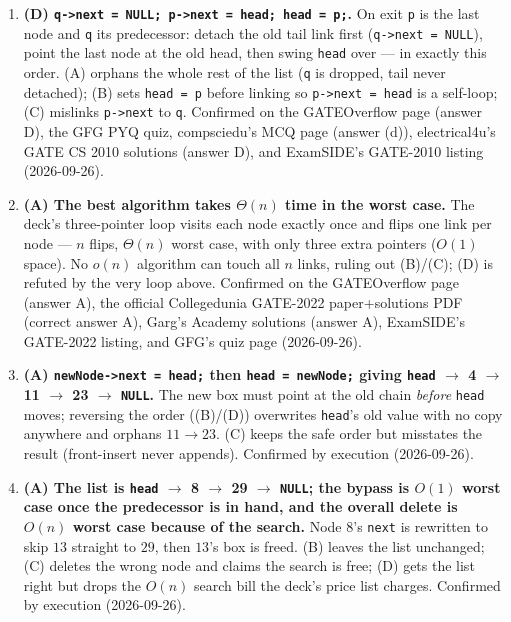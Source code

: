 \documentclass[11pt]{article}
\begin{document}
\begin{enumerate}
\item[\textbf{Q5}] \textbf{(D) \texttt{q->next = NULL; p->next = head; head = p;}.} On exit \texttt{p} is the last node and \texttt{q} its predecessor: detach the old tail link first (\texttt{q->next = NULL}), point the last node at the old head, then swing \texttt{head} over --- in exactly this order. (A) orphans the whole rest of the list (\texttt{q} is dropped, tail never detached); (B) sets \texttt{head = p} before linking so \texttt{p->next = head} is a self-loop; (C) mislinks \texttt{p->next} to \texttt{q}. Confirmed on the GATEOverflow page (answer D), the GFG PYQ quiz, compsciedu's MCQ page (answer (d)), electrical4u's GATE CS 2010 solutions (answer D), and ExamSIDE's GATE-2010 listing (2026-09-26).

\item[\textbf{Q6}] \textbf{(A) The best algorithm takes $\Theta(n)$ time in the worst case.} The deck's three-pointer loop visits each node exactly once and flips one link per node --- $n$ flips, $\Theta(n)$ worst case, with only three extra pointers ($O(1)$ space). No $o(n)$ algorithm can touch all $n$ links, ruling out (B)/(C); (D) is refuted by the very loop above. Confirmed on the GATEOverflow page (answer A), the official Collegedunia GATE-2022 paper+solutions PDF (correct answer A), Garg's Academy solutions (answer A), ExamSIDE's GATE-2022 listing, and GFG's quiz page (2026-09-26).

\item[\textbf{Q7}] \textbf{(A) \texttt{newNode->next = head;} then \texttt{head = newNode;} giving \texttt{head} $\to$ 4 $\to$ 11 $\to$ 23 $\to$ \texttt{NULL}.} The new box must point at the old chain \emph{before} \texttt{head} moves; reversing the order ((B)/(D)) overwrites \texttt{head}'s old value with no copy anywhere and orphans $11 \to 23$. (C) keeps the safe order but misstates the result (front-insert never appends). Confirmed by execution (2026-09-26).

\item[\textbf{Q8}] \textbf{(A) The list is \texttt{head} $\to$ 8 $\to$ 29 $\to$ \texttt{NULL}; the bypass is $O(1)$ worst case once the predecessor is in hand, and the overall delete is $O(n)$ worst case because of the search.} Node $8$'s \texttt{next} is rewritten to skip $13$ straight to $29$, then $13$'s box is freed. (B) leaves the list unchanged; (C) deletes the wrong node and claims the search is free; (D) gets the list right but drops the $O(n)$ search bill the deck's price list charges. Confirmed by execution (2026-09-26).
\end{enumerate}
\end{document}
